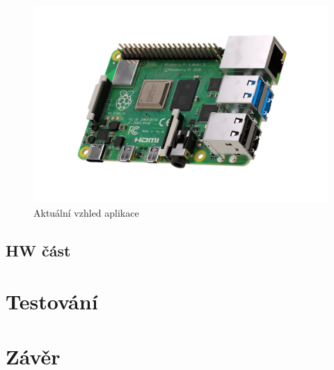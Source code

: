 \begin{figure}[hbt]
  \centering
  \includegraphics[width=1 \linewidth]{obrazky-figures/raspberry.png}
  \caption{Aktuální vzhled aplikace}
  \label{figure:actual_app}
\end{figure}

\newpage
\section{HW část}
\label{impl:hw}


\chapter{Testování}
\label{testovani}

\chapter{Závěr}
\label{zaver}
